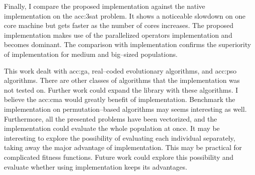 Finally, I compare the proposed implementation against the native \cpp implementation on the \acrshort{acc:3sat} problem. It shows a noticeable slowdown on one core machine but gets faster as the number of cores increases. The proposed implementation makes use of the parallelized operators implementation and becomes dominant. The comparison with \cpp implementation confirms the superiority of \cuda implementation for medium and big--sized populations.

This work dealt with \acrshort{acc:ga}, real--coded evolutionary algorithms, and \acrshort{acc:pso} algorithms. There are other classes of algorithms that the implementation was not tested on. Further work could expand the library with these algorithms. I believe the \acrshort{acc:cma} would greatly benefit of \cuda implementation. Benchmark the implementation on permutation--based algorithms may seems interesting as well. Furthermore, all the presented problems have been vectorized, and the \gpu implementation could evaluate the whole population at once. It may be interesting to explore the possibility of evaluating each individual separately, taking away the major advantage of \gpu implementation. This may be practical for complicated fitness functions. Future work could explore this possibility and evaluate whether using \gpu implementation keeps its advantages.